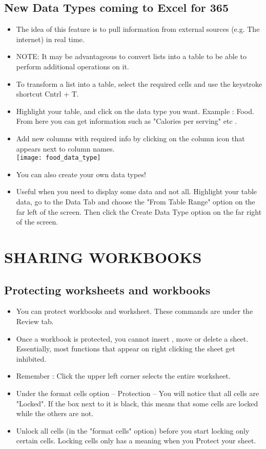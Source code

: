 \documentclass[11pt, oneside]{article}   	%
\begin{document}
\subsection{New Data Types coming to Excel for 365}
\begin{itemize}
\item The idea of this feature is to pull information from external sources (e.g. The internet) in real time. 
\item NOTE: It may be advantageous to convert lists into a table to be able to perform additional operations on it.
\item To transform a list into a table, select the required cells and use the keystroke shortcut Cntrl + T.
\item Highlight your table, and click on the data type you want. Example : Food. From here you can get information such as "Calories per serving" etc .
\item Add new columns with required info by clicking on the column icon that appears next to column names. 
\bigskip\\
\texttt{[image: food\_data\_type]}
\bigskip\\
\item You can also create your own data types!
\item Useful when you need to display some data and not all.  Highlight your table data, go to the Data Tab and choose the "From Table Range" option on the far left of the screen. Then click the Create Data Type option on the far right of the screen.
\end{itemize}
\section{SHARING WORKBOOKS}
\subsection{Protecting worksheets and workbooks}
\begin{itemize}
\item You can protect workbooks and worksheet. These commands are under the Review tab.
\item Once a workbook is protected, you cannot insert , move or delete a sheet. Essentially, most functions that appear on right clicking the sheet get inhibited.
\item Remember : Click the upper left corner selects the entire worksheet.
\item Under the format cells option -- Protection -- You will notice that all cells are "Locked". If the box next to it is black, this means that some cells are locked while the others are not.
\item Unlock all cells (in the "format cells" option) before you start locking only certain cells. Locking cells only has a meaning when you Protect your sheet.
\end{itemize}
\end{document}
